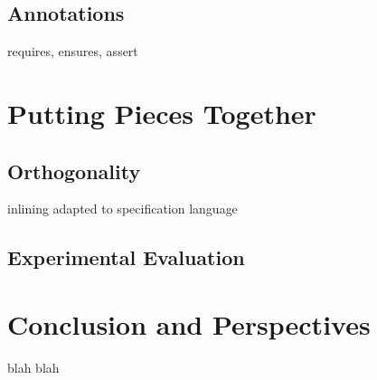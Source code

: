 \documentclass[a4paper,12pt,oneside]{report}
\theoremstyle{plain}
\begin{document}
\section{Annotations}

requires, ensures, assert

\chapter{Putting Pieces Together}

\section{Orthogonality}

inlining adapted to specification language

\section{Experimental Evaluation}

\chapter{Conclusion and Perspectives}

blah blah



\end{document}
